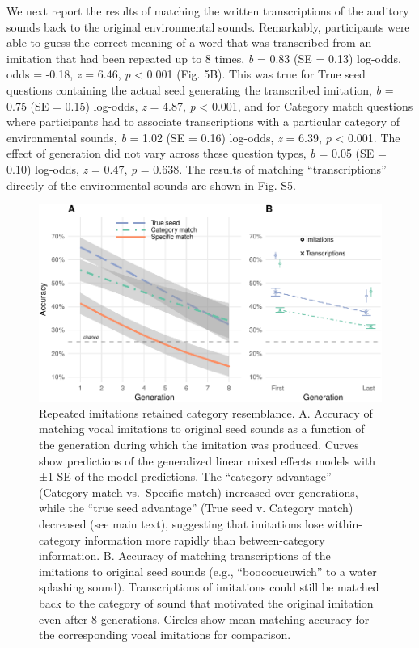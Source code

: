 \documentclass[english,floatsintext,man]{apa6}
\theoremstyle{definition}
\theoremstyle{definition}
\theoremstyle{remark}
\begin{document}
We next report the results of matching the written transcriptions of the
auditory sounds back to the original environmental sounds. Remarkably,
participants were able to guess the correct meaning of a word that was
transcribed from an imitation that had been repeated up to 8 times,
\emph{b} = 0.83 (SE = 0.13) log-odds, odds = -0.18, \emph{z} = 6.46,
\emph{p} \textless{} 0.001 (Fig. 5B). This was true for True seed
questions containing the actual seed generating the transcribed
imitation, \emph{b} = 0.75 (SE = 0.15) log-odds, \emph{z} = 4.87,
\emph{p} \textless{} 0.001, and for Category match questions where
participants had to associate transcriptions with a particular category
of environmental sounds, \emph{b} = 1.02 (SE = 0.16) log-odds, \emph{z}
= 6.39, \emph{p} \textless{} 0.001. The effect of generation did not
vary across these question types, \emph{b} = 0.05 (SE = 0.10) log-odds,
\emph{z} = 0.47, \emph{p} = 0.638. The results of matching
\enquote{transcriptions} directly of the environmental sounds are shown
in Fig. S5.

\begin{figure}
\centering
\includegraphics{fig5-1.pdf}
\caption{\label{fig:fig5}Repeated imitations retained category resemblance.
A. Accuracy of matching vocal imitations to original seed sounds as a
function of the generation during which the imitation was produced.
Curves show predictions of the generalized linear mixed effects models
with ±1 SE of the model predictions. The \enquote{category advantage}
(Category match vs.~Specific match) increased over generations, while
the \enquote{true seed advantage} (True seed v. Category match)
decreased (see main text), suggesting that imitations lose
within-category information more rapidly than between-category
information. B. Accuracy of matching transcriptions of the imitations to
original seed sounds (e.g., \enquote{boococucuwich} to a water splashing
sound). Transcriptions of imitations could still be matched back to the
category of sound that motivated the original imitation even after 8
generations. Circles show mean matching accuracy for the corresponding
vocal imitations for comparison.}
\end{figure}
\end{document}

